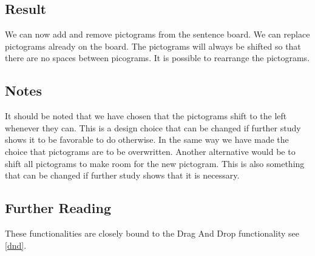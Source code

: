 \subsection*{Result}
We can now add and remove pictograms from the sentence board. We can replace pictograms already on the board. The pictograms will always be shifted so that there are no spaces between picograms. It is possible to rearrange the pictograms.


\subsection*{Notes}
It should be noted that we have chosen that the pictograms shift to the left whenever they can. This is a design choice that can be changed if further study shows it to be favorable to do otherwise. 
In the same way we have made the choice that pictograms are to be overwritten. Another alternative would be to shift all pictograms to make room for the new pictogram. This is also something that can be changed if further study shows that it is necessary.


\subsection*{Further Reading}
These functionalities are closely bound to the Drag And Drop functionality see \autoref{dnd}.